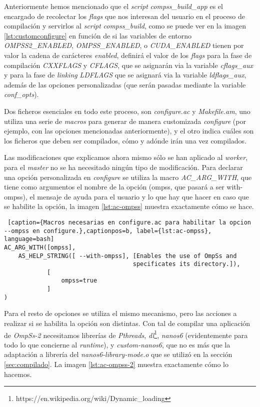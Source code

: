 Anteriormente hemos mencionado que el \textit{script} \textit{compss\_build\_app} es el encargado de recolectar los \textit{flags} que nos interesan del usuario en el proceso de compilación y servirlos al \textit{script} \textit{compss\_build}, como se puede ver en la imagen \ref{lst:customconfigure} en función de si las variables de entorno \textit{OMPSS2\_ENABLED}, \textit{OMPSS\_ENABLED}, o \textit{CUDA\_ENABLED} tienen por valor la cadena de carácteres \textit{enabled}, definirá el valor de los \textit{flags} para la fase de compilación \textit{CXXFLAGS} y \textit{CFLAGS}, que se asignarán via la variable \textit{cflags\_aux} y para la fase de \textit{linking} \textit{LDFLAGS} que se asignará via la variable \textit{ldflags\_aux}, además de las opciones personalizadas (que serán pasadas mediante la variable \textit{conf\_opts}).
\par\smallskip
Dos ficheros esenciales en todo este proceso, son \textit{configure.ac} y \textit{Makefile.am}, uno utiliza una serie de \textit{macros} para generar de manera customizada \textit{configure} (por ejemplo, con las opciones mencionadas anteriormente), y el otro indica cuáles son los ficheros que deben ser compilados, cómo y adónde irán una vez compilados.
\par\bigskip
Las modificaciones que explicamos ahora mismo sólo se han aplicado al \textit{worker}, para el \textit{master} no se ha necesitado ningún tipo de modificación. Para declarar una opción personalizada en \textit{configure} se utiliza la macro \textit{AC\_ARG\_WITH}, que tiene como argumentos el nombre de la opción (ompss, que pasará a ser with-ompss), el mensaje de ayuda para el usuario y lo que hay que hacer en caso que se habilite la opción, la imagen \ref{lst:ac-ompss} muestra exactamente cómo se hace.
\smallskip

\begin{lstlisting} [caption={Macros necesarias en configure.ac para habilitar la opcion --ompss en configure.},captionpos=b, label={lst:ac-ompss}, language=bash]
AC_ARG_WITH([ompss],
    AS_HELP_STRING([ --with-ompss], [Enables the use of OmpSs and 
                                    specificates its directory.]),
            [
                ompss=true
            ]
)
\end{lstlisting}

Para el resto de opciones se utiliza el mismo mecanismo, pero las acciones a realizar si se habilita la opción son distintas. Con tal de compilar una aplicación de \textit{OmpSs-2} necesitamos librerías de \textit{Pthreads}, \textit{dl}\footnote{https://en.wikipedia.org/wiki/Dynamic\_loading}, \textit{nanos6} (evidentemente para todo lo que concierne al \textit{runtime}), y \textit{custom-nanos6}, que no es más que la adaptación a librería del \textit{nanos6-library-mode.o} que se utilizó en la sección \ref{sec:compilado}. La imagen \ref{lst:ac-ompss-2} muestra exactamente cómo lo hacemos.
\smallskip

